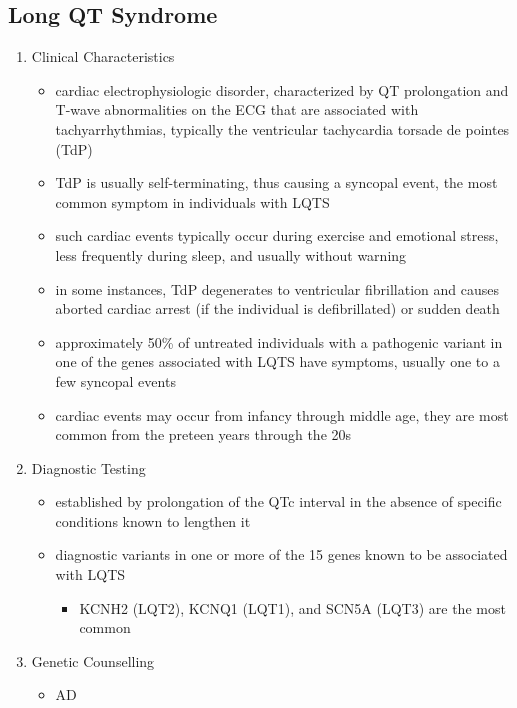 \documentclass[12pt]{scrartcl}
\begin{document}
\subsection{Long QT Syndrome}
\label{sec:org82820a7}
\begin{enumerate}
\item Clinical Characteristics
\label{sec:org48fb0b6}
\begin{itemize}
\item cardiac electrophysiologic disorder, characterized by QT
prolongation and T-wave abnormalities on the ECG that are associated
with tachyarrhythmias, typically the ventricular tachycardia torsade
de pointes (TdP)
\item TdP is usually self-terminating, thus causing a syncopal event, the
most common symptom in individuals with LQTS
\item such cardiac events typically occur during exercise and emotional
stress, less frequently during sleep, and usually without warning
\item in some instances, TdP degenerates to ventricular fibrillation and
causes aborted cardiac arrest (if the individual is defibrillated)
or sudden death
\item approximately 50\% of untreated individuals with a pathogenic variant
in one of the genes associated with LQTS have symptoms, usually one
to a few syncopal events
\item cardiac events may occur from infancy through middle age, they are
most common from the preteen years through the 20s
\end{itemize}
\item Diagnostic Testing
\label{sec:org32fb0b8}
\begin{itemize}
\item established by prolongation of the QTc interval in the absence of
specific conditions known to lengthen it
\item diagnostic variants in one or more of the 15 genes known to be
associated with LQTS
\begin{itemize}
\item KCNH2 (LQT2), KCNQ1 (LQT1), and SCN5A (LQT3) are the most common
\end{itemize}
\end{itemize}
\item Genetic Counselling
\label{sec:orge1a1c8c}
\begin{itemize}
\item AD
\end{itemize}
\end{enumerate}
\end{document}
